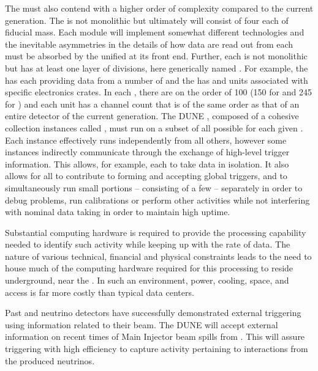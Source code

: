 The %
 must also contend with a higher order of
complexity compared to the current generation. 
The  is not monolithic but ultimately will consist
of four  each of \nominalmodsize fiducial mass. 
Each module will %
implement somewhat different %
technologies and the
inevitable asymmetries in the details of how data are read out from
each must be absorbed by the unified  at its front end. 
Further, each  is not monolithic but has at least one
layer of divisions, here generically named . 
For example, the  has  each
providing data from a number of  and the  has
 and  units associated with specific electronics
crates.
In each , there are on the order of \num{100} 
(\num{150} for  and \num{245} for ) and each unit has a
channel count that is of the same order as that of an entire \lartpc
detector of the current generation.
The DUNE , composed of a cohesive collection  instances
called
, must run on a subset of all possible
 for each given . 
Each instance effectively runs independently from all others, however
some instances indirectly communicate through the exchange of
high-level trigger information. 
This allows, for example, each  to take data in
isolation. It also allows for all  to contribute to forming and
accepting global  triggers, and to simultaneously run small portions -- consisting of a few  -- separately in
order to debug problems, run calibrations or %
 perform other activities while not interfering with nominal data taking in order to maintain high uptime.

Substantial computing hardware is required to provide the processing
capability needed to identify such activity while keeping up with the
rate of data.
The nature of various technical, financial and physical constraints
leads to the need to house much of the computing hardware %
required for this processing
to reside underground, near the . 
In such an environment, power, cooling, space, and access is far more
costly than typical data centers. %

Past \lartpc and  neutrino detectors have successfully
demonstrated external triggering using information related to their beam. %
The DUNE   will accept external information on recent
times of Main Injector beam spills from \fnal. %
This will assure triggering with high efficiency to capture activity
pertaining to interactions from the produced neutrinos. 

